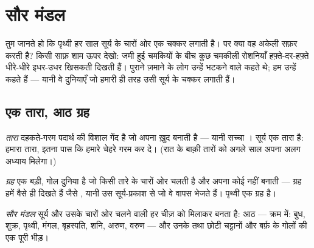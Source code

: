 \chapter{सौर मंडल}\label{ch:g4:solar-system}

तुम जानते हो कि पृथ्वी हर साल सूर्य के चारों ओर एक चक्कर लगाती है। पर
क्या वह अकेली सफ़र करती है? किसी साफ़ शाम ऊपर देखो: जमी हुई
चमकियों के बीच कुछ चमकीली रोशनियाँ हफ़्ते-दर-हफ़्ते धीरे-धीरे इधर-उधर
खिसकती दिखती हैं। पुराने ज़माने के लोग उन्हें भटकने वाले कहते थे; हम
उन्हें  कहते हैं --- यानी वे दुनियाएँ जो हमारी ही तरह उसी सूर्य
के चक्कर लगाती हैं।

\section{एक तारा, आठ ग्रह}

\begin{definition}[तारा]\label{def:g4:solar-system:star}
\emph{तारा} दहकते-गरम पदार्थ की विशाल गेंद है जो अपना
 ख़ुद बनाती है --- यानी सच्चा । सूर्य एक तारा है:
हमारा तारा, इतना पास कि हमारे चेहरे गरम कर दे। (रात के बाक़ी तारों को
अगले साल अपना अलग अध्याय मिलेगा।)
\end{definition}

\begin{definition}[ग्रह]\label{def:g4:solar-system:planet}
\emph{ग्रह} एक बड़ी, गोल दुनिया है जो किसी तारे के चारों
ओर चलती है और अपना कोई  नहीं बनाती --- ग्रह हमें वैसे ही दिखते
हैं जैसे , यानी उस सूर्य-प्रकाश से जो वे वापस भेजते हैं।
पृथ्वी एक ग्रह है।
\end{definition}

\begin{definition}[सौर मंडल]\label{def:g4:solar-system:family}
\emph{सौर मंडल} सूर्य और उसके चारों ओर चलने वाली हर
चीज़ को मिलाकर बनता है: आठ  --- क्रम में: बुध, शुक्र, पृथ्वी,
मंगल, बृहस्पति, शनि, अरुण, वरुण --- और उनके  तथा छोटी चट्टानों
और बर्फ़ के गोलों की एक पूरी भीड़।
\end{definition}

